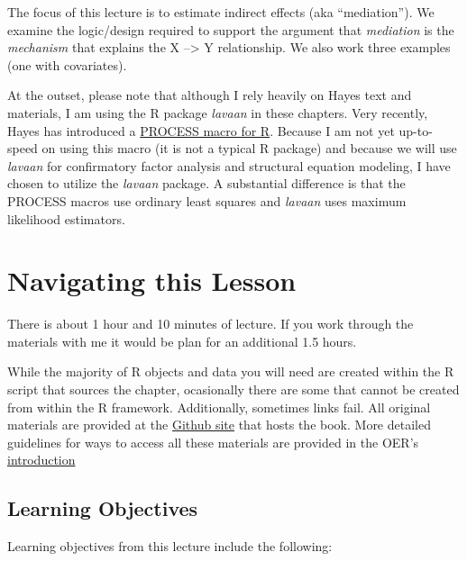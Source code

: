 \documentclass[
  11pt,
]{book}
\begin{document}
The focus of this lecture is to estimate indirect effects (aka ``mediation''). We examine the logic/design required to support the argument that \emph{mediation} is the \emph{mechanism} that explains the X --\textgreater{} Y relationship. We also work three examples (one with covariates).

At the outset, please note that although I rely heavily on Hayes \citeyearpar{hayes_introduction_2018} text and materials, I am using the R package \emph{lavaan} in these chapters. Very recently, Hayes has introduced a \href{https://www.processmacro.org/index.html}{PROCESS macro for R}. Because I am not yet up-to-speed on using this macro (it is not a typical R package) and because we will use \emph{lavaan} for confirmatory factor analysis and structural equation modeling, I have chosen to utilize the \emph{lavaan} package. A substantial difference is that the PROCESS macros use ordinary least squares and \emph{lavaan} uses maximum likelihood estimators.

\hypertarget{navigating-this-lesson-4}{%
\section{Navigating this Lesson}\label{navigating-this-lesson-4}}

There is about 1 hour and 10 minutes of lecture. If you work through the materials with me it would be plan for an additional 1.5 hours.

While the majority of R objects and data you will need are created within the R script that sources the chapter, ocasionally there are some that cannot be created from within the R framework. Additionally, sometimes links fail. All original materials are provided at the \href{https://github.com/lhbikos/ReC_MultivModel}{Github site} that hosts the book. More detailed guidelines for ways to access all these materials are provided in the OER's \protect\hyperlink{ReCintro}{introduction}

\hypertarget{learning-objectives-4}{%
\subsection{Learning Objectives}\label{learning-objectives-4}}

Learning objectives from this lecture include the following:
\end{document}
